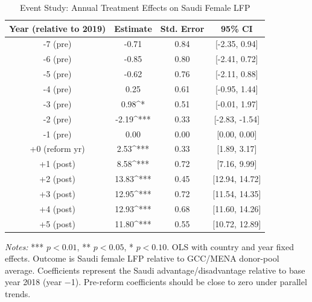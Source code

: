 \begin{table}[htbp]
\centering
\caption{Event Study: Annual Treatment Effects on Saudi Female LFP}
\label{tab:event}
\begin{tabular}{cccc}
\hline\hline
Year (relative to 2019) & Estimate & Std. Error & 95\% CI \\
\hline
-7 (pre) & -0.71 & 0.84 & [-2.35, 0.94] \\
-6 (pre) & -0.85 & 0.80 & [-2.41, 0.72] \\
-5 (pre) & -0.62 & 0.76 & [-2.11, 0.88] \\
-4 (pre) & 0.25 & 0.61 & [-0.95, 1.44] \\
-3 (pre) & 0.98^{*} & 0.51 & [-0.01, 1.97] \\
-2 (pre) & -2.19^{***} & 0.33 & [-2.83, -1.54] \\
-1 (pre) & 0.00 & 0.00 & [0.00, 0.00] \\
+0 (reform yr) & 2.53^{***} & 0.33 & [1.89, 3.17] \\
+1 (post) & 8.58^{***} & 0.72 & [7.16, 9.99] \\
+2 (post) & 13.83^{***} & 0.45 & [12.94, 14.72] \\
+3 (post) & 12.95^{***} & 0.72 & [11.54, 14.35] \\
+4 (post) & 12.93^{***} & 0.68 & [11.60, 14.26] \\
+5 (post) & 11.80^{***} & 0.55 & [10.72, 12.89] \\
\hline\hline
\end{tabular}
\begin{minipage}{0.95\textwidth}
{\footnotesize \textit{Notes:} *** $p<0.01$, ** $p<0.05$, * $p<0.10$. OLS with country and year fixed effects. Outcome is Saudi female LFP relative to GCC/MENA donor-pool average. Coefficients represent the Saudi advantage/disadvantage relative to base year 2018 (year $-$1). Pre-reform coefficients should be close to zero under parallel trends.}
\end{minipage}
\end{table}

